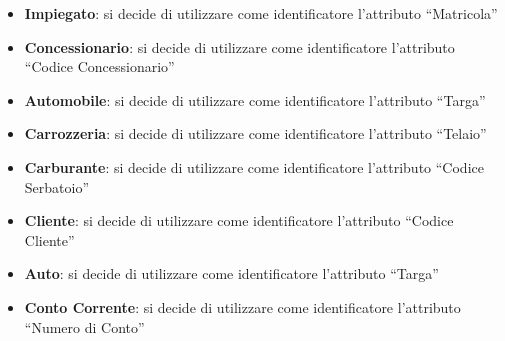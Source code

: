 \documentclass[12pt,a4paper]{article}
\begin{document}
 \begin{itemize}
 	\item \textbf{Impiegato}: si decide di utilizzare come identificatore l’attributo “Matricola”
 	\item \textbf{Concessionario}: si decide di utilizzare come identificatore l’attributo “Codice Concessionario”
 	\item \textbf{Automobile}: si decide di utilizzare come identificatore l’attributo “Targa”
 	\item \textbf{Carrozzeria}: si decide di utilizzare come identificatore l’attributo “Telaio”
 	\item \textbf{Carburante}: si decide di utilizzare come identificatore l’attributo “Codice Serbatoio”  
 	\item \textbf{Cliente}: si decide di utilizzare come identificatore l’attributo “Codice Cliente”
 	\item \textbf{Auto}: si decide di utilizzare come identificatore l’attributo “Targa”
 	\item \textbf{Conto Corrente}: si decide di utilizzare come identificatore l’attributo “Numero di Conto”
 	
 \end{itemize} 
\pagebreak
 
\end{document}
